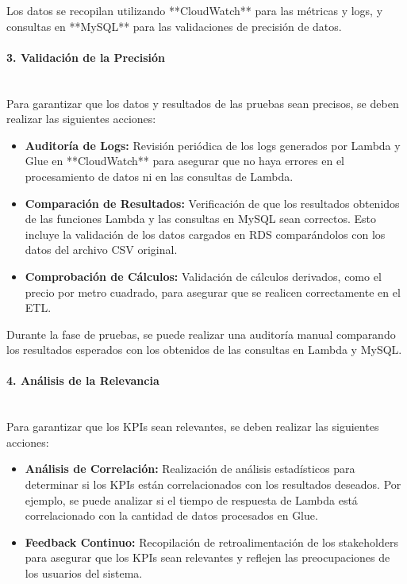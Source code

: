 \documentclass{article}
\begin{document}
Los datos se recopilan utilizando **CloudWatch** para las métricas y logs, y consultas en **MySQL** para las validaciones de precisión de datos.

\paragraph{3. Validación de la Precisión} \mbox{} \\
Para garantizar que los datos y resultados de las pruebas sean precisos, se deben realizar las siguientes acciones:

\begin{itemize}
    \item \textbf{Auditoría de Logs:} Revisión periódica de los logs generados por Lambda y Glue en **CloudWatch** para asegurar que no haya errores en el procesamiento de datos ni en las consultas de Lambda.
    \item \textbf{Comparación de Resultados:} Verificación de que los resultados obtenidos de las funciones Lambda y las consultas en MySQL sean correctos. Esto incluye la validación de los datos cargados en RDS comparándolos con los datos del archivo CSV original.
    \item \textbf{Comprobación de Cálculos:} Validación de cálculos derivados, como el precio por metro cuadrado, para asegurar que se realicen correctamente en el ETL.
\end{itemize}

Durante la fase de pruebas, se puede realizar una auditoría manual comparando los resultados esperados con los obtenidos de las consultas en Lambda y MySQL.

\paragraph{4. Análisis de la Relevancia} \mbox{} \\
Para garantizar que los KPIs sean relevantes, se deben realizar las siguientes acciones:

\begin{itemize}
    \item \textbf{Análisis de Correlación:} Realización de análisis estadísticos para determinar si los KPIs están correlacionados con los resultados deseados. Por ejemplo, se puede analizar si el tiempo de respuesta de Lambda está correlacionado con la cantidad de datos procesados en Glue.
    \item \textbf{Feedback Continuo:} Recopilación de retroalimentación de los stakeholders para asegurar que los KPIs sean relevantes y reflejen las preocupaciones de los usuarios del sistema.
\end{itemize}
\end{document}
